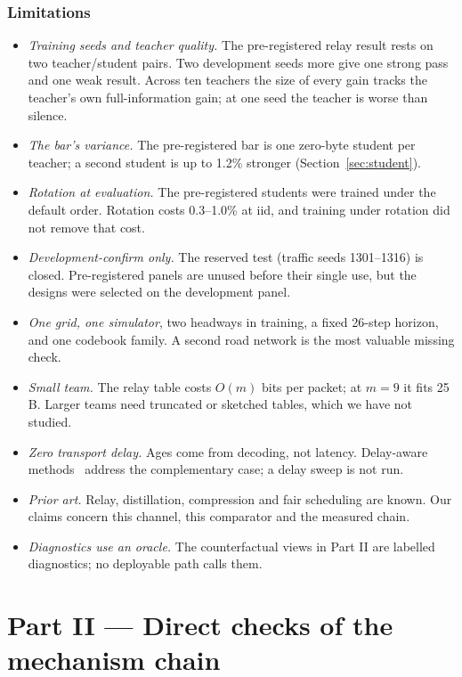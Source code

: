 \documentclass[11pt]{article}
\theoremstyle{definition}
\begin{document}
\section{Limitations}\label{sec:limits}
\begin{itemize}
\item \emph{Training seeds and teacher quality.} The pre-registered relay result rests on two teacher/student pairs. Two
development seeds more give one strong pass and one weak result. Across ten teachers the size of every gain tracks the
teacher's own full-information gain; at one seed the teacher is worse than silence.
\item \emph{The bar's variance.} The pre-registered bar is one zero-byte student per teacher; a second student is up to
1.2\% stronger (Section~\ref{sec:student}).
\item \emph{Rotation at evaluation.} The pre-registered students were trained under the default order. Rotation costs
0.3--1.0\% at iid, and training under rotation did not remove that cost.
\item \emph{Development-confirm only.} The reserved test (traffic seeds 1301--1316) is closed. Pre-registered panels
are unused before their single use, but the designs were selected on the development panel.
\item \emph{One grid, one simulator}, two headways in training, a fixed 26-step horizon, and one codebook family. A second
road network is the most valuable missing check.
\item \emph{Small team.} The relay table costs $O(m)$ bits per packet; at $m=9$ it fits 25\,B. Larger teams need
truncated or sketched tables, which we have not studied.
\item \emph{Zero transport delay.} Ages come from decoding, not latency. Delay-aware methods~\cite{caic,vil2c,code}
address the complementary case; a delay sweep is not run.
\item \emph{Prior art.} Relay, distillation, compression and fair scheduling are known. Our claims concern this channel,
this comparator and the measured chain.
\item \emph{Diagnostics use an oracle.} The counterfactual views in Part II are labelled diagnostics; no deployable path
calls them.
\end{itemize}

\part*{Part II --- Direct checks of the mechanism chain}
\end{document}
